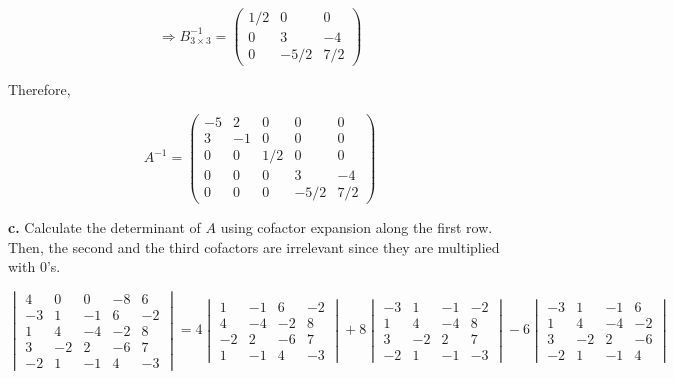 \documentclass{article}
\begin{document}
  \begin{equation*}
    \Rightarrow B_{3\times3}^{-1} =
    \begin{pmatrix}
      1/2 & 0 & 0 \\
      0 & 3 & -4 \\
      0 & -5/2 & 7/2
    \end{pmatrix}    
  \end{equation*}

  Therefore,

  \begin{equation*}
A^{-1} =
\begin{pmatrix}
  -5 & 2 & 0 & 0 & 0 \\
  3 & -1 & 0 & 0 & 0 \\
  0 & 0 & 1/2 & 0 & 0 \\
  0 & 0 & 0 & 3 & -4 \\
  0 & 0 & 0 & -5/2 & 7/2
\end{pmatrix}
  \end{equation*}

  \textbf{c.} Calculate the determinant of $A$ using cofactor expansion along the first row. Then, the second and the third cofactors are irrelevant since they are multiplied with $0$'s.

  \begin{equation*}
    \begin{vmatrix}
      4 & 0 & 0 & -8 & 6 \\
      -3 & 1 & -1 & 6 & -2 \\
      1 & 4 & -4 & -2 & 8 \\
      3 & -2 & 2 & -6 & 7 \\
      -2 & 1 & -1 & 4 & -3
    \end{vmatrix} =
    4\begin{vmatrix}
      1 & -1 & 6 & -2 \\
      4 & -4 & -2 & 8 \\
      -2 & 2 & -6 & 7 \\
      1 & -1 & 4 & -3
    \end{vmatrix}
    +8\begin{vmatrix}
      -3 & 1 & -1 & -2 \\
      1 & 4 & -4 & 8 \\
      3 & -2 & 2 & 7 \\
      -2 & 1 & -1 & -3
    \end{vmatrix}
    -6 \begin{vmatrix}
      -3 & 1 & -1 & 6 \\
      1 & 4 & -4 & -2 \\
      3 & -2 & 2 & -6 \\
      -2 & 1 & -1 & 4
      \end{vmatrix}
  \end{equation*}
\end{document}
